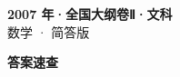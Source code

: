 \documentclass[zihao=-4, a4paper]{ctexart}
\begin{document}
\begin{center}
  {\Large\bfseries 2007 年·全国大纲卷Ⅱ·文科}\\[4pt]
  {\large 数学 · 简答版}
\end{center}
\medskip
{}

\clearpage
{}
\begin{center}{\Large\bfseries 答案速查}\end{center}
\medskip

\end{document}
